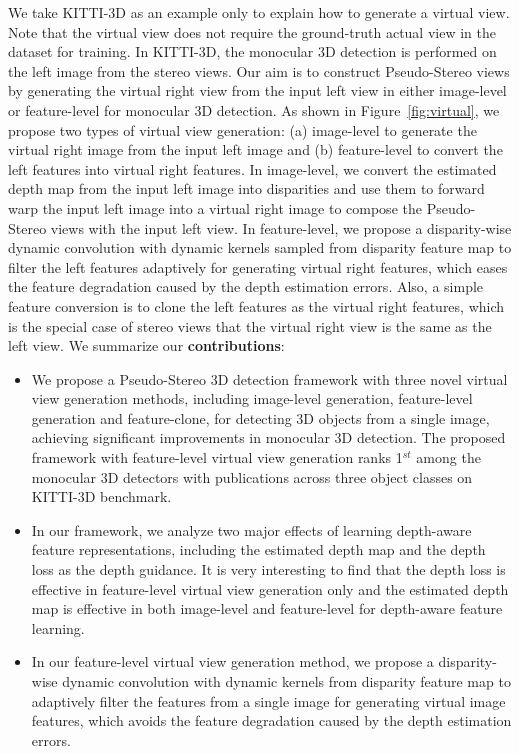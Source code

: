\documentclass[10pt,twocolumn,letterpaper]{article}
\begin{document}
 

We take KITTI-3D as an example only to explain how to generate a virtual view. Note that the virtual view does not require the ground-truth actual view in the dataset for training. In KITTI-3D, the monocular 3D detection is performed on the left image from the stereo views. Our aim is to construct Pseudo-Stereo views by generating the virtual right view from the input left view in either image-level or feature-level for monocular 3D detection. As shown in Figure~\ref{fig:virtual}, we propose two types of virtual view generation: (a) image-level to generate the virtual right image from the input left image and (b) feature-level to convert the left features into virtual right features. In image-level, we convert the estimated depth map from the input left image into disparities and use them to forward warp the input left image into a virtual right image to compose the Pseudo-Stereo views with the input left view. In feature-level, we propose a disparity-wise dynamic convolution with dynamic kernels sampled from disparity feature map to filter the left features adaptively for generating virtual right features, which eases the feature degradation caused by the depth estimation errors.
Also, a simple feature conversion is to clone the left features as the virtual right features, which is the special case of stereo views that the virtual right view is the same as the left view. We summarize our \textbf{contributions}:
\begin{itemize}
\vspace{-3mm}
    \item We propose a Pseudo-Stereo 3D detection framework with three novel virtual view generation methods, including image-level generation, feature-level generation and feature-clone, for detecting 3D objects from a single image, achieving significant improvements in monocular 3D detection. The proposed framework with feature-level virtual view generation ranks 1$^{st}$ among the monocular 3D detectors with publications across three object classes on KITTI-3D benchmark.
    \vspace{-3mm}
    \item In our framework, we analyze two major effects of learning depth-aware feature representations, including the estimated depth map and the depth loss as the depth guidance. It is very interesting to find that the depth loss is effective in feature-level virtual view generation only and the estimated depth map is effective in both image-level and feature-level for depth-aware feature learning.    
    \vspace{-3mm}
    \item In our feature-level virtual view generation method, we propose a disparity-wise dynamic convolution with dynamic kernels from disparity feature map to adaptively filter the features from a single image for generating virtual image features, which avoids the feature degradation caused by the depth estimation errors.
\end{itemize}
 
\end{document}
